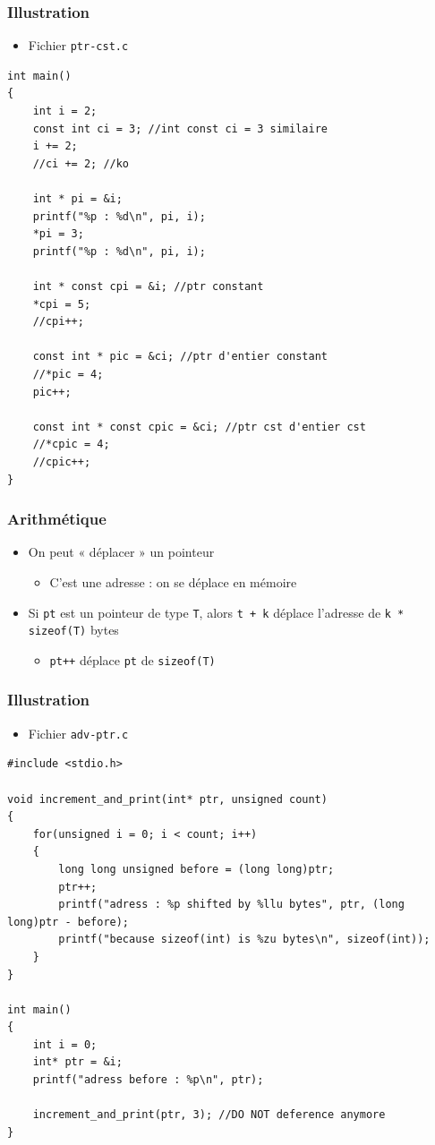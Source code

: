 \begin{frame}[containsverbatim]
\frametitle{Illustration}
\begin{itemize}
\item Fichier \texttt{ptr-cst.c}
\end{itemize}
\begin{lstlisting}
int main()
{
	int i = 2;
	const int ci = 3; //int const ci = 3 similaire
	i += 2;
	//ci += 2; //ko

	int * pi = &i; 
	printf("%p : %d\n", pi, i);
	*pi = 3; 
	printf("%p : %d\n", pi, i);

	int * const cpi = &i; //ptr constant
	*cpi = 5;
	//cpi++;

	const int * pic = &ci; //ptr d'entier constant	
	//*pic = 4;	
	pic++;

	const int * const cpic = &ci; //ptr cst d'entier cst
	//*cpic = 4;	
	//cpic++;
}
\end{lstlisting}
\end{frame}

\begin{frame}
\frametitle{Arithmétique}
\begin{itemize}[<+->]
\item On peut « déplacer » un pointeur
	\begin{itemize}
	\item C'est une adresse : on se déplace en mémoire
	\end{itemize}
\item Si \texttt{pt} est un pointeur de type \texttt{T}, alors \texttt{t + k} déplace l'adresse de \lstinline|k * sizeof(T)| bytes
	\begin{itemize}
	\item \texttt{pt++} déplace \texttt{pt} de \lstinline|sizeof(T)|
	\end{itemize}
\end{itemize}
\end{frame}

\begin{frame}[containsverbatim]
\frametitle{Illustration}
\begin{itemize}
\item Fichier \texttt{adv-ptr.c}
\end{itemize}
\begin{lstlisting}
#include <stdio.h>

void increment_and_print(int* ptr, unsigned count)
{
    for(unsigned i = 0; i < count; i++)
    {
        long long unsigned before = (long long)ptr;
        ptr++;
        printf("adress : %p shifted by %llu bytes", ptr, (long long)ptr - before);
        printf("because sizeof(int) is %zu bytes\n", sizeof(int));
    }
}

int main()
{
    int i = 0;
    int* ptr = &i;
    printf("adress before : %p\n", ptr);
    
    increment_and_print(ptr, 3); //DO NOT deference anymore    
}
\end{lstlisting}
\end{frame}

